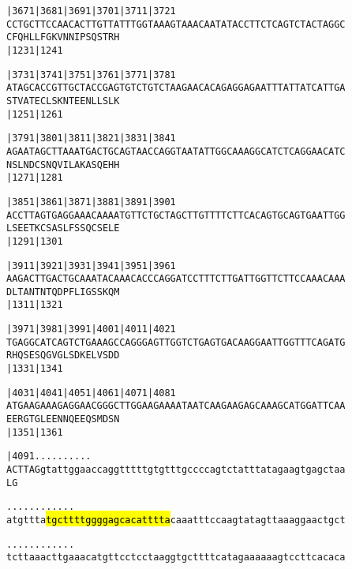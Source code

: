 \documentclass{article}
\begin{document}
\newpage
\begin{alltt}
|3671     |3681     |3691     |3701     |3711     |3721     
CCTGCTTCCAACACTTGTTATTTGGTAAAGTAAACAATATACCTTCTCAGTCTACTAGGC
  C  F  Q  H  L  L  F  G  K  V  N  N  I  P  S  Q  S  T  R  H
                    |1231                         |1241     

|3731     |3741     |3751     |3761     |3771     |3781     
ATAGCACCGTTGCTACCGAGTGTCTGTCTAAGAACACAGAGGAGAATTTATTATCATTGA
  S  T  V  A  T  E  C  L  S  K  N  T  E  E  N  L  L  S  L  K
                    |1251                         |1261     

|3791     |3801     |3811     |3821     |3831     |3841     
AGAATAGCTTAAATGACTGCAGTAACCAGGTAATATTGGCAAAGGCATCTCAGGAACATC
  N  S  L  N  D  C  S  N  Q  V  I  L  A  K  A  S  Q  E  H  H
                    |1271                         |1281     

|3851     |3861     |3871     |3881     |3891     |3901     
ACCTTAGTGAGGAAACAAAATGTTCTGCTAGCTTGTTTTCTTCACAGTGCAGTGAATTGG
  L  S  E  E  T  K  C  S  A  S  L  F  S  S  Q  C  S  E  L  E
                    |1291                         |1301     

|3911     |3921     |3931     |3941     |3951     |3961     
AAGACTTGACTGCAAATACAAACACCCAGGATCCTTTCTTGATTGGTTCTTCCAAACAAA
  D  L  T  A  N  T  N  T  Q  D  P  F  L  I  G  S  S  K  Q  M
                    |1311                         |1321     

|3971     |3981     |3991     |4001     |4011     |4021     
TGAGGCATCAGTCTGAAAGCCAGGGAGTTGGTCTGAGTGACAAGGAATTGGTTTCAGATG
  R  H  Q  S  E  S  Q  G  V  G  L  S  D  K  E  L  V  S  D  D
                    |1331                         |1341     

|4031     |4041     |4051     |4061     |4071     |4081     
ATGAAGAAAGAGGAACGGGCTTGGAAGAAAATAATCAAGAAGAGCAAAGCATGGATTCAA
  E  E  R  G  T  G  L  E  E  N  N  Q  E  E  Q  S  M  D  S  N
                    |1351                         |1361     

|4091     .    .    .    .    .    .    .    .    .    .    
ACTTAGgtattggaaccaggtttttgtgtttgccccagtctatttatagaagtgagctaa
  L  G                                                      

.    .    .    .    .    .    .    .    .    .    .    .    
atgttta\hl{tgcttttggggagcacatttta}caaatttccaagtatagttaaaggaactgct

.    .    .    .    .    .    .    .    .    .    .    .    
tcttaaacttgaaacatgttcctcctaaggtgcttttcatagaaaaaagtccttcacaca

\end{alltt}
\end{document}
